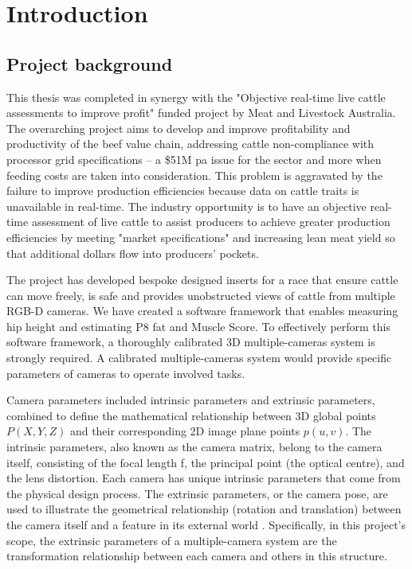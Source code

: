 \lhead{}

\chapter{Introduction}

\section{Project background}

This thesis was completed in synergy with the "Objective real-time live cattle assessments to improve profit" funded project by Meat and Livestock Australia. The overarching project aims to develop and improve profitability and productivity of the beef value chain, addressing cattle non-compliance with processor grid specifications – a \$51M pa issue for the sector and more when feeding costs are taken into consideration. This problem is aggravated by the failure to improve production efficiencies because data on cattle traits is unavailable in real-time. The industry opportunity is to have an objective real-time assessment of live cattle to assist producers to achieve greater production efficiencies by meeting "market specifications" and increasing lean meat yield so that additional dollars flow into producers' pockets.

The project has developed bespoke designed inserts for a race that ensure cattle can move freely, is safe and provides unobstructed views of cattle from multiple RGB-D cameras. We have created a software framework that enables measuring hip height and estimating P8 fat and Muscle Score. To effectively perform this software framework, a thoroughly calibrated 3D multiple-cameras system is strongly required. A calibrated multiple-cameras system would provide specific parameters of cameras to operate involved tasks. 

Camera parameters included intrinsic parameters and extrinsic parameters, combined to define the mathematical relationship between 3D global points $P(X, Y, Z)$ and their corresponding 2D image plane points $p(u, v)$. The intrinsic parameters, also known as the camera matrix, belong to the camera itself, consisting of the focal length f, the principal point (the optical centre), and the lens distortion. Each camera has unique intrinsic parameters that come from the physical design process. The extrinsic parameters, or the camera pose, are used to illustrate the geometrical relationship (rotation and translation) between the camera itself and a feature in its external world \citep{Zhang2014}. Specifically, in this project's scope, the extrinsic parameters of a multiple-camera system are the transformation relationship between each camera and others in this structure.

